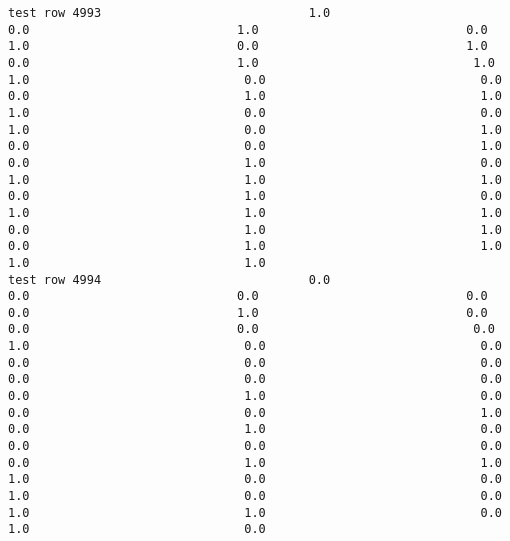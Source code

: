 \documentclass[11pt]{article}
\begin{document}
\begin{verbatim}
test row 4993                             1.0                             0.0                             1.0                             0.0                             1.0                             0.0                             1.0                             0.0                             1.0                              1.0                              1.0                              0.0                              0.0                              0.0                              1.0                              1.0                              1.0                              0.0                              0.0                              1.0                              0.0                              1.0                              0.0                              0.0                              1.0                              0.0                              1.0                              0.0                              1.0                              1.0                              1.0                              0.0                              1.0                              0.0                              1.0                              1.0                              1.0                              0.0                              1.0                              1.0                              0.0                              1.0                              1.0                              1.0                              1.0
test row 4994                             0.0                             0.0                             0.0                             0.0                             0.0                             1.0                             0.0                             0.0                             0.0                              0.0                              1.0                              0.0                              0.0                              0.0                              0.0                              0.0                              0.0                              0.0                              0.0                              0.0                              1.0                              0.0                              0.0                              0.0                              1.0                              0.0                              1.0                              0.0                              0.0                              0.0                              0.0                              0.0                              1.0                              1.0                              1.0                              0.0                              0.0                              1.0                              0.0                              0.0                              1.0                              1.0                              0.0                              1.0                              0.0

\end{verbatim}
\end{document}
